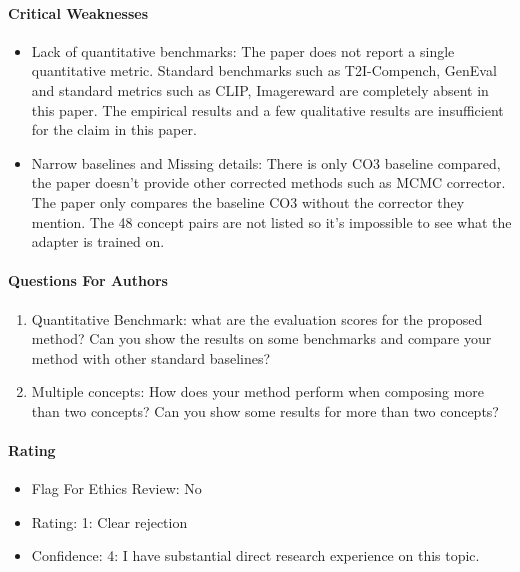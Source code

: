 {\begin{tcolorbox}[breakable,colback=red!3,colframe=red!45!black,title={The review by PrzE, as posted on OpenReview}]
\paragraph{Critical Weaknesses}
\begin{itemize}
\item Lack of quantitative benchmarks: The paper does not report a single quantitative metric. Standard benchmarks such as T2I-Compench, GenEval and standard metrics such as CLIP, Imagereward are completely absent in this paper. The empirical results and a few qualitative results are insufficient for the claim in this paper.
\item Narrow baselines and Missing details: There is only CO3 baseline compared, the paper doesn't provide other corrected methods such as MCMC corrector. The paper only compares the baseline CO3 without the corrector they mention. The 48 concept pairs are not listed so it's impossible to see what the adapter is trained on.
\end{itemize}
\paragraph{Questions For Authors}
\begin{enumerate}
\item Quantitative Benchmark: what are the evaluation scores for the proposed method? Can you show the results on some benchmarks and compare your method with other standard baselines?
\item Multiple concepts: How does your method perform when composing more than two concepts? Can you show some results for more than two concepts?
\end{enumerate}
\paragraph{Rating}
\begin{itemize}
\item Flag For Ethics Review: No
\item Rating: 1: Clear rejection
\item Confidence: 4: I have substantial direct research experience on this topic.
\end{itemize}
\end{tcolorbox}
}
\expandafter\long\expandafter{}
